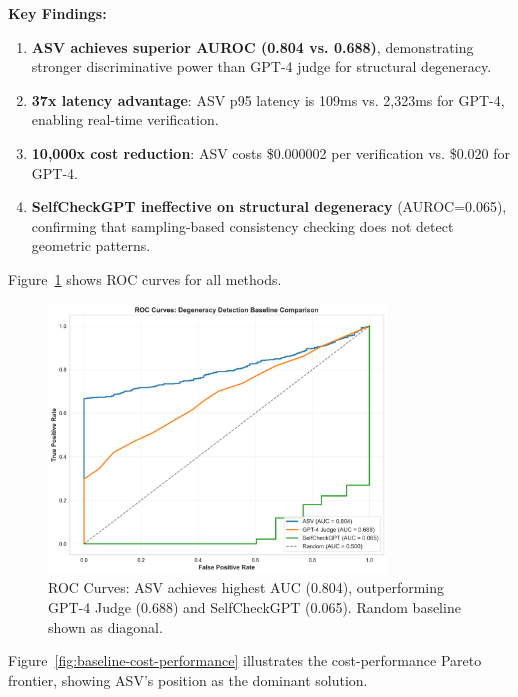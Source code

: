 \documentclass[11pt]{article}
\begin{document}
\textbf{Key Findings:}
\begin{enumerate}
\item \textbf{ASV achieves superior AUROC (0.804 vs. 0.688)}, demonstrating stronger discriminative power than GPT-4 judge for structural degeneracy.
\item \textbf{37x latency advantage}: ASV p95 latency is 109ms vs. 2,323ms for GPT-4, enabling real-time verification.
\item \textbf{10,000x cost reduction}: ASV costs \$0.000002 per verification vs. \$0.020 for GPT-4.
\item \textbf{SelfCheckGPT ineffective on structural degeneracy} (AUROC=0.065), confirming that sampling-based consistency checking does not detect geometric patterns.
\end{enumerate}

Figure~\ref{fig:baseline-roc} shows ROC curves for all methods.

\begin{figure}[h]
\centering
\includegraphics[width=0.8\textwidth]{figures/baseline_roc_comparison.png}
\caption{ROC Curves: ASV achieves highest AUC (0.804), outperforming GPT-4 Judge (0.688) and SelfCheckGPT (0.065). Random baseline shown as diagonal.}
\label{fig:baseline-roc}
\end{figure}

Figure~\ref{fig:baseline-cost-performance} illustrates the cost-performance Pareto frontier, showing ASV's position as the dominant solution.
\end{document}
